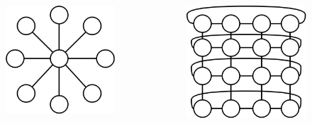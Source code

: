 \documentclass{beamer}
\begin{document}
\begin{frame}
\begin{columns}[c]
\begin{figure}
\includegraphics[width=.8\linewidth,right]{star.jpg}
\end{figure}

\begin{figure}
\includegraphics[width=.8\linewidth,right]{torus.jpg}
\end{figure}
\end{columns}
\end{frame}
\end{document}
